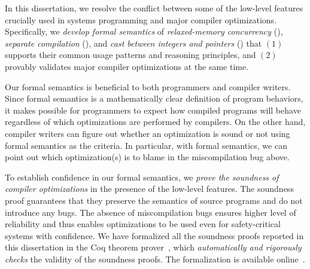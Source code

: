 In this dissertation, we resolve the conflict between some of the low-level features crucially used
in systems programming and major compiler optimizations.  Specifically, we \emph{develop formal
  semantics} of \emph{relaxed-memory concurrency} (), \emph{separate compilation}
(), and \emph{cast between integers and pointers} () that
$(1)$ supports their common usage patterns and reasoning principles, and $(2)$ provably validates
major compiler optimizations at the same time.



Our formal semantics is beneficial to both programmers and compiler writers.  Since formal semantics
is a mathematically clear definition of program behaviors, it makes possible for programmers to
expect how compiled programs will behave regardless of which optimizations are performed by
compilers.  On the other hand, compiler writers can figure out whether an optimization is sound or
not using formal semantics as the criteria.  In particular, with formal semantics, we can point out
which optimization(s) is to blame in the miscompilation bug above.

To establish confidence in our formal semantics, we \emph{prove the soundness of compiler
  optimizations} in the presence of the low-level features.  The soundness proof guarantees that
they preserve the semantics of source programs and do not introduce any bugs.  The absence of
miscompilation bugs ensures higher level of reliability and thus enables optimizations to be used
even for safety-critical systems with confidence.  We have formalized all the soundness proofs
reported in this dissertation in the Coq theorem prover~\cite{coq}, which \emph{automatically and
  rigorously checks} the validity of the soundness proofs.  The formalization is available
online~\cite{kang-phd-thesis-web}.



\paragraph*{}


